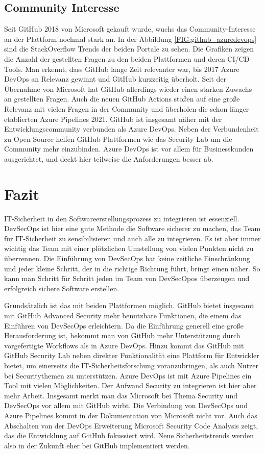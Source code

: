 \section{Community Interesse}
Seit GitHub 2018 von Microsoft gekauft wurde, wuchs das Community-Interesse an der Plattform nochmal stark an. In der Abbildung \ref{FIG:github_azuredevops} sind die StackOverflow Trends der beiden Portale zu sehen. Die Grafiken zeigen die Anzahl der gestellten Fragen zu den beiden Plattformen und deren CI/CD-Tools. Man erkennt, dass GitHub lange Zeit relevanter war, bis 2017 Azure DevOps an Relevanz gewinnt und GitHub kurzzeitig überholt. Seit der Übernahme von Microsoft hat GitHub allerdings wieder einen starken Zuwachs an gestellten Fragen. Auch die neuen GitHub Actions stoßen auf eine große Relevanz mit vielen Fragen in der Community und überholen die schon länger etablierten Azure Pipelines 2021. GitHub ist insgesamt näher mit der Entwicklungscommunity verbunden als Azure DevOps. Neben der Verbundenheit zu Open Source helfen GitHub Plattformen wie das Security Lab um die Community mehr einzubinden. Azure DevOps ist vor allem für Businesskunden ausgerichtet, und deckt hier teilweise die Anforderungen besser ab.

\chapter{Fazit}
IT-Sicherheit in den Softwareerstellungsprozess zu integrieren ist essenziell. DevSecOps ist hier eine gute Methode die Software sicherer zu machen, das Team für IT-Sicherheit zu sensibilisieren und auch alle zu integrieren. Es ist aber immer wichtig das Team mit einer plötzlichen Umstellung von vielen Punkten nicht zu überrennen. Die Einführung von DevSecOps hat keine zeitliche Einschränkung und jeder kleine Schritt, der in die richtige Richtung führt, bringt einen näher. So kann man Schritt für Schritt jeden im Team von DevSecOpos überzeugen und erfolgreich sichere Software erstellen.

Grundsätzlich ist das mit beiden Plattformen möglich. GitHub bietet insgesamt mit GitHub Advanced Security mehr benutzbare Funktionen, die einem das Einführen von DevSecOps erleichtern. Da die Einführung generell eine große Herausforderung ist, bekommt man von GitHub mehr Unterstützung durch vorgefertigte Workflows als in Azure DevOps. Hinzu kommt das GitHub mit GitHub Security Lab neben direkter Funktionalität eine Plattform für Entwickler bietet, um einerseits die IT-Sicherheitsforschung voranzubringen, als auch Nutzer bei Securitythemen zu unterstützen.
Azure DevOps ist mit Azure Pipelines ein Tool mit vielen Möglichkeiten. Der Aufwand Security zu integrieren ist hier aber mehr Arbeit.
Insgesamt merkt man das Microsoft bei Thema Security und  DevSecOps vor allem mit GitHub wirbt. Die Verbindung von DevSecOps und Azure Pipelines kommt in der Dokumentation von Microsoft nicht vor. Auch das Abschalten von der DevOps Erweiterung Microsoft Security Code Analysis zeigt, das die Entwicklung auf GitHub fokussiert wird. Neue Sicherheitstrends werden also in der Zukunft eher bei GitHub implementiert werden.